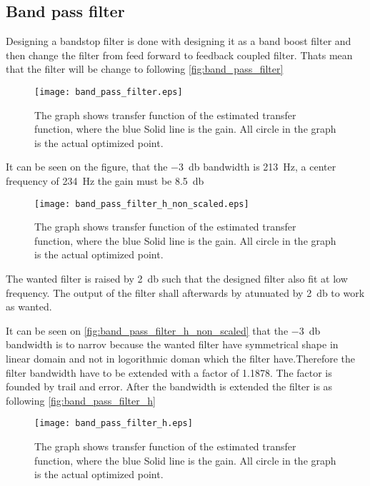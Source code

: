 \subsection{Band pass filter}

Designing a bandstop filter is done with designing it as a band boost filter and then change the filter from feed forward to feedback coupled filter. Thats mean that the filter will be change to following \autoref{fig:band_pass_filter}


\begin{figure}[H]
	\centering
	\texttt{[image: band\_pass\_filter.eps]}
	\caption{The graph shows transfer function of the estimated transfer function, where the blue  Solid line is the gain. All circle in the graph is the actual optimized point.}
		\label{fig:band_pass_filter}
\end{figure}

It can be seen on the figure, that the \SI{-3}{\decibel} bandwidth is \SI{213}{\hertz}, a center frequency of \SI{234}{\hertz} the gain must be \SI{8.5}{\decibel} 


\begin{figure}[H]
	\centering
	\texttt{[image: band\_pass\_filter\_h\_non\_scaled.eps]}
	\caption{The graph shows transfer function of the estimated transfer function, where the blue  Solid line is the gain. All circle in the graph is the actual optimized point.}
		\label{fig:band_pass_filter_h_non_scaled}
\end{figure}

The wanted filter is raised by \SI{2}{\decibel} such that the designed filter also fit at low frequency. The output of the filter shall afterwards by atunuated by  \SI{2}{\decibel} to work as wanted.


It can be seen on \autoref{fig:band_pass_filter_h_non_scaled} that the \SI{-3}{\decibel} bandwidth is to narrov because the wanted filter have symmetrical shape in linear domain and not in logorithmic doman which the filter have.Therefore the filter bandwidth have to be extended with a factor of 1.1878. The factor is founded by trail and error. After the bandwidth is extended the filter is as following \autoref{fig:band_pass_filter_h}


\begin{figure}[H]
	\centering
	\texttt{[image: band\_pass\_filter\_h.eps]}
	\caption{The graph shows transfer function of the estimated transfer function, where the blue  Solid line is the gain. All circle in the graph is the actual optimized point.}
		\label{fig:band_pass_filter_h}
\end{figure}



